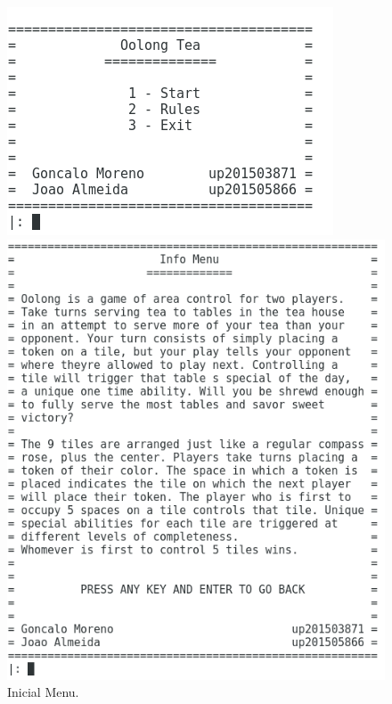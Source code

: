 \documentclass[a4paper]{article}
\begin{document}
\begin{figure}[H]
\centering
{}
  \includegraphics[width=\linewidth]{menu_inicial.png} \hspace{0.5cm}
  \caption{Inicial Menu.}\label{fig:menu_inicial}
\endminipage \hspace{2mm}
  \includegraphics[width=\linewidth]{menu_info.png} \hspace{0.5cm}

\end{figure}
\end{document}
